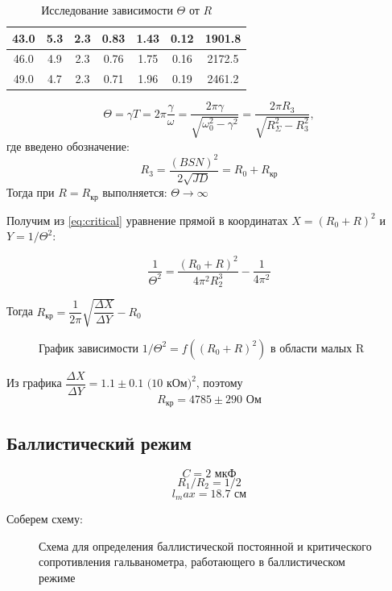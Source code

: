 \documentclass[a4paper, 12pt]{article}
\begin{document}
\begin{table}[H]
\begin{tabular}{|c|c|c|c|c|c|c|}
43.0             & 5.3   & 2.3       & 0.83     & 1.43         & 0.12                  & 1901.8                  \\ \hline
46.0             & 4.9   & 2.3       & 0.76     & 1.75         & 0.16                  & 2172.5                  \\ \hline
49.0             & 4.7   & 2.3       & 0.71     & 1.96         & 0.19                  & 2461.2                  \\ \hline
\end{tabular}
\caption{Исследование зависимости $\Theta$ от $R$}
\end{table}

\begin{equation}
\Theta = \gamma T = 2 \pi \dfrac{\gamma}{\omega} = \dfrac{2 \pi \gamma}{\sqrt{\omega_0^2 - \gamma^2}} = \dfrac{2 \pi R_3}{\sqrt{R_\Sigma^2 - R_3^2}},
\label{eq:critical}
\end{equation}
где введено обозначение:
$$R_3 = \frac{(BSN)^2}{2\sqrt{JD}} = R_0 + R_\text{кр}$$
Тогда при $R = R_\text{кр}$  выполняется: $\Theta \rightarrow \infty$

Получим из \ref{eq:critical} уравнение прямой в координатах $X = (R_0 + R)^2$ и $Y = 1/\Theta^2$:

$$\dfrac{1}{\Theta^2} = \dfrac{(R_0 + R)^2}{4 \pi^2 R_2^3} - \dfrac{1}{4 \pi^2}$$

Тогда $R_\text{кр} = \dfrac{1}{2 \pi} \sqrt{\dfrac{\Delta X}{\Delta Y}} - R_0$

\begin {figure}[H]
	\begin{center}
		\caption{График зависимости $1/\Theta^2 = f((R_0 + R)^2)$ в области малых R}
	\end{center}
\end {figure}


Из графика $\dfrac{\Delta X}{\Delta Y} = 1.1 \pm 0.1 \text{ (10 кОм)}^2$, поэтому 
$$R_\text{кр} = 4785 \pm 290 \text{ Ом}$$

\subsection*{Баллистический режим}

$$C = 2 \text{ мкФ}$$
$$R_1/R_2 = 1/2$$
$$l_max = 18.7 \text{ см}$$

Соберем схему:

\begin {figure}[H]
	\begin{center}
		\caption{Схема для определения баллистической постоянной и критического сопротивления гальванометра, работающего в баллистическом режиме}
	\end{center}
\end {figure}
\end{document}
